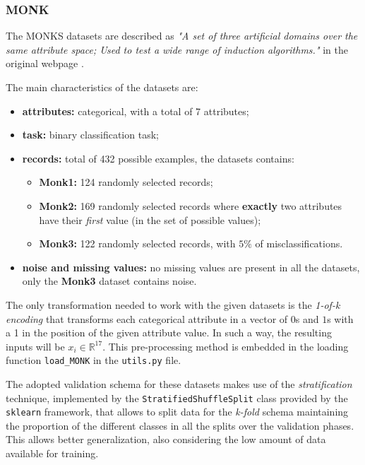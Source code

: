 \subsubsection{MONK}
The MONKS datasets are described as \textit{"A set of three artificial domains over the same attribute space; Used to test a wide range of induction algorithms."} in the original webpage \cite{monk_link}.

The main characteristics of the datasets are:
\begin{itemize}
    \item \textbf{attributes:} categorical, with a total of 7 attributes;
    \item \textbf{task:} binary classification task;
    \item \textbf{records:} total of 432 possible examples, the datasets contains:
        \begin{itemize}
            \item \textbf{Monk1:} 124 randomly selected records;
            \item \textbf{Monk2:} 169 randomly selected records where \textbf{exactly} two attributes have their \textit{first} value (in the set of possible values);
            \item \textbf{Monk3:} 122 randomly selected records, with $5\%$ of misclassifications.
        \end{itemize}
    \item \textbf{noise and missing values:} no missing values are present in all the datasets, only the \textbf{Monk3} dataset contains noise.
\end{itemize}

The only transformation needed to work with the given datasets is the \textit{1-of-k encoding} that transforms each categorical attribute in a vector of $\mathit{0}$s and $\mathit{1}$s with a 1 in the position of the given attribute value. In such a way, the resulting inputs will be $x_i \in \mathbb{R}^{17}$. This pre-processing method is embedded in the loading function \texttt{load\_MONK} in the \texttt{utils.py} file.

The adopted validation schema for these datasets makes use of the \textit{stratification} technique, implemented by the \texttt{StratifiedShuffleSplit} class provided by the \texttt{sklearn} framework, that allows to split data for the \textit{k-fold} schema maintaining the proportion of the different classes in all the splits over the validation phases. This allows better generalization, also considering the low amount of data available for training.